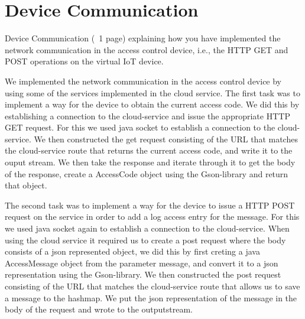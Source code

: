 \section{Device Communication}
\label{sec:prototype}

Device Communication (~1 page) explaining how you have implemented the network communication in the access control device, i.e., the HTTP GET and POST operations on the virtual IoT device.

We implemented the network communication in the access control device by using some of the services implemented in the cloud service.
The first task was to implement a way for the device to obtain the current access code. We did this by establishing a connection to the cloud-service and issue the appropriate HTTP GET request.
For this we used java socket to establish a connection to the cloud-service. We then constructed the get request consisting of the URL that matches the cloud-service route that returns the current access code, and write it to the ouput stream. We then take the response and iterate through it to get the body of the response, create a AccessCode object using the Gson-library and return that object.

The second task was to implement a way for the device to  issue a HTTP POST request on the service in order to add a log access entry for the message.
For this we used java socket again to establish a connection to the cloud-service. When using the cloud service it required us to create a post request where the body consists of a json represented object, we did this by first creting a java AccessMessage object from the parameter message, and convert it to a json representation using the Gson-library. We then constructed the post request consisting of the URL that matches the cloud-service route that allows us to save a message to the hashmap. We  put the json representation of the message in the body of the request and wrote to the outputstream.
   

